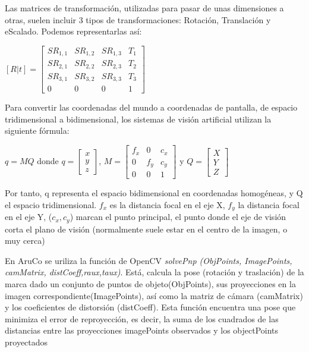 \documentclass[10pt,a4paper]{article}
\begin{document}
Las matrices de transformación, utilizadas para pasar de unas dimensiones a otras, suelen incluir 3 tipos de transformaciones: Rotación, Translación y eScalado. Podemos representarlas así:
\begin{center}
$[R|t] = \begin{bmatrix} SR_{1,1} & SR_{1,2} & SR_{1,3} & T_{1}  \\
                                 SR_{2,1} & SR_{2,2} & SR_{2,3} & T_{2}  \\
                                 SR_{3,1} & SR_{3,2} & SR_{3,3} & T_{3}  \\
                                     0    &     0    &     0    &  1 
                  \end{bmatrix}
$
\end{center}

Para convertir las coordenadas del mundo a coordenadas de pantalla, de espacio tridimensional a bidimensional, los sistemas de visión artificial utilizan la siguiente fórmula:

\begin{center}
$q=MQ$ donde $q=\begin{bmatrix} x \\ y \\ z \end{bmatrix}$, $M=\begin{bmatrix} f_{x} & 0 & c_{x} \\ 0 & f_{y} & c_{y} \\ 0 & 0 & 1 \end{bmatrix}$ y $Q=\begin{bmatrix} X \\ Y \\ Z \end{bmatrix}$
\end{center}

Por tanto, q representa el espacio bidimensional en coordenadas homogéneas, y Q el espacio tridimensional. $f_{x}$ es la distancia focal en el eje X, $f_{y}$ la distancia focal en el eje Y, ($c_{x},c_{y}$) marcan el punto principal, el punto donde el eje de visión corta el plano de visión (normalmente suele estar en el centro de la imagen, o muy cerca) 

En AruCo se uriliza la función de OpenCV \textit{solvePnp (ObjPoints, ImagePoints, camMatrix, distCoeff,raux,taux)}.   Está, calcula la pose (rotación y traslación) de la marca dado un conjunto de puntos de objeto(ObjPoints), sus proyecciones en la imagen correspondiente(ImagePoints), así como la matriz de cámara (camMatrix) y los coeficientes de distorsión (distCoeff). Esta función encuentra una pose que minimiza el error de reproyección, es decir, la suma de los cuadrados de las distancias entre las proyecciones imagePoints observados y los objectPoints proyectados
\end{document}
